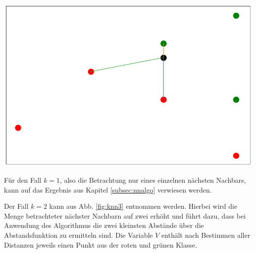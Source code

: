 \documentclass[fontsize=11pt]{scrartcl}
\newenvironment{Figure}
  {\par\medskip\noindent\minipage{\linewidth}}
  {\endminipage\par\medskip}
\begin{document}
\begin{Figure}
\begin{minipage}[b]{.25\linewidth}
                        \label{fig:knn3}
                    \end{minipage}
                    \hspace*{.1\linewidth}
                    \begin{minipage}[b]{.25\linewidth}
                        \includegraphics[width=\linewidth]{knn4.png}
                        \label{fig:knn4}
                    \end{minipage}
                \end{Figure}
                
                Für den Fall $k=1$, also die Betrachtung nur eines einzelnen nächsten Nachbars, kann auf das Ergebnis aus Kapitel \ref{subsec:nnalgo} verwiesen werden.\par  
              	              
                         
                        
                
              Der Fall $k=2$ kann aus Abb. \ref{fig:knn3} entnommen werden. Hierbei wird die Menge betrachteter nächster Nachbarn auf zwei erhöht und führt dazu, dass bei Anwendung des Algorithmus die zwei kleinsten Abstände über die Abstandsfunktion zu ermitteln sind. Die Variable $V$ enthält nach Bestimmen aller Distanzen jeweils einen Punkt aus der roten und grünen Klasse.
\end{document}
